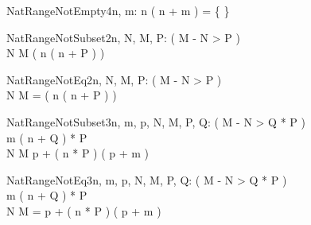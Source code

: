 \begin{theorem}{NatRangeNotEmpty4}{n, m: \nat}
n \upto ( n + m ) = \{ \}
\end{theorem}

\begin{theorem}{NatRangeNotSubset2}{n, \const N, \const M, \const P: \nat}
\eval( M - N > P ) \\
N \upto M \subset ( n \upto ( n + P ) )
\end{theorem}

\begin{theorem}{NatRangeNotEq2}{n, \const N, \const M, \const P: \nat}
\eval( M - N > P ) \\
N \upto M = ( n \upto ( n + P ) )
\end{theorem}

\begin{theorem}{NatRangeNotSubset3}{n, m, p, \const N, \const M, \const P, \const Q: \nat}
\eval( M - N > Q * P ) \\
m \leq ( n + Q ) * P \\
N \upto M \subset p + ( n * P ) \upto ( p + m )
\end{theorem}

\begin{theorem}{NatRangeNotEq3}{n, m, p, \const N, \const M, \const P, \const Q: \nat}
\eval( M - N > Q * P ) \\
m \leq ( n + Q ) * P \\
N \upto M = p + ( n * P ) \upto ( p + m )
\end{theorem}

